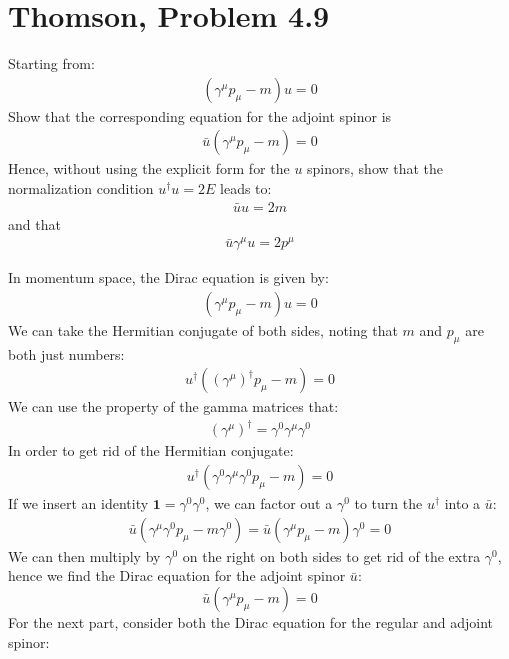 \documentclass[12pt]{article}
\begin{document}
\section{Thomson, Problem 4.9}
\begin{problem}
  Starting from:
  \begin{align*}
    (\gamma^\mu p_\mu-m)u=0
  \end{align*}
  Show that the corresponding equation for the adjoint spinor is
  \begin{align*}
    \bar{u}(\gamma^\mu p_\mu-m)=0
  \end{align*}
  Hence, without using the explicit form for the $u$ spinors, show that the normalization condition $u^\dag u=2E$ leads to:
  \begin{align*}
    \bar{u}u=2m
  \end{align*}
  and that
  \begin{align*}
    \bar{u}\gamma^\mu u=2p^\mu
  \end{align*}
\end{problem}
In momentum space, the Dirac equation is given by:
\begin{align*}
  (\gamma^\mu p_\mu-m)u=0
\end{align*}
We can take the Hermitian conjugate of both sides, noting that $m$ and $p_\mu$ are both just numbers:
\begin{align*}
  u^\dag((\gamma^\mu)^\dag p_\mu-m)=0
\end{align*}
We can use the property of the gamma matrices that:
\begin{align*}
  (\gamma^\mu)^\dag=\gamma^0\gamma^\mu\gamma^0
\end{align*}
In order to get rid of the Hermitian conjugate:
\begin{align*}
  u^\dag(\gamma^0\gamma^\mu\gamma^0 p_\mu-m)=0
\end{align*}
If we insert an identity $\bm{1}=\gamma^0\gamma^0$, we can factor out a $\gamma^0$ to turn the $u^\dag$ into a $\bar{u}$:
\begin{align*}
  \bar{u}(\gamma^\mu\gamma^0 p_\mu-m\gamma^0)
  =\bar{u}(\gamma^\mu p_\mu-m)\gamma^0=0
\end{align*}
We can then multiply by $\gamma^0$ on the right on both sides to get rid of the extra $\gamma^0$, hence we find the Dirac equation for the adjoint spinor $\bar{u}$:
\begin{equation}
  \label{eq:p8a}
  \boxed{\bar{u}(\gamma^\mu p_\mu-m)=0}
\end{equation}
For the next part, consider both the Dirac equation for the regular and adjoint spinor:
\end{document}

